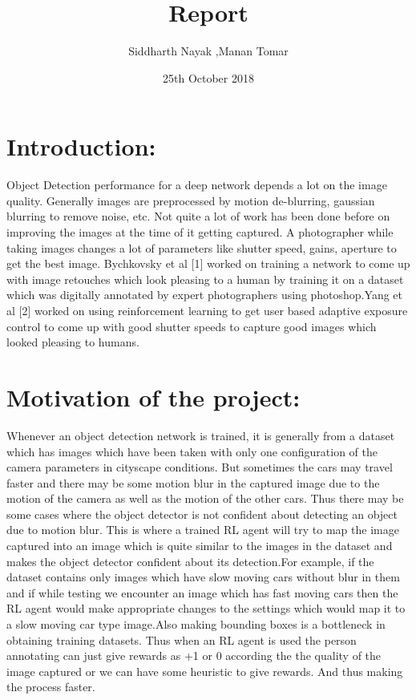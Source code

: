 \documentclass{article}
\title{Report}
\date{25th October 2018}
\author{Siddharth Nayak ,Manan Tomar}
\begin{document}
\maketitle
\newcommand{\norm}[1]{\left\lVert#1\right\rVert}


\section{Introduction:}
Object Detection performance for a deep network depends a lot on the image quality. Generally images are preprocessed by motion de-blurring, gaussian blurring to remove noise, etc. Not quite a lot of work has been done before on improving the images at the time of it getting captured. A photographer while taking images changes a lot of parameters like shutter speed, gains, aperture to get the best image. Bychkovsky et al [1] worked on training a network to come up with image retouches which look pleasing to a human by training it on a dataset which was digitally annotated by expert photographers using photoshop.Yang et al [2] worked on using reinforcement learning to get user based adaptive exposure control to come up with good shutter speeds to capture good images which looked pleasing to humans.

\section{Motivation of the project:}
Whenever an object detection network is trained, it is generally from a dataset which has images which have been taken with only one configuration of the camera parameters in cityscape conditions. But sometimes the cars may travel faster and there may be some motion blur in the captured image due to the motion of the camera as well as the motion of the other cars. Thus there may be some cases where the object detector is not confident about detecting an object due to motion blur. This is where a trained RL agent will try to map the image captured into an image which is quite similar to the images in the dataset and makes the object detector confident about its detection.For example, if the dataset contains only images which have slow moving cars without blur in them and if while testing we encounter an image which has fast moving cars then the RL agent would make appropriate changes to the settings which would map it to a slow moving car type image.Also making bounding boxes is a bottleneck in obtaining training datasets. Thus when an RL agent is used the person annotating can just give rewards as +1 or 0 according the the quality of the image captured or we can have some heuristic to give rewards. And thus making the process faster.
\end{document}
